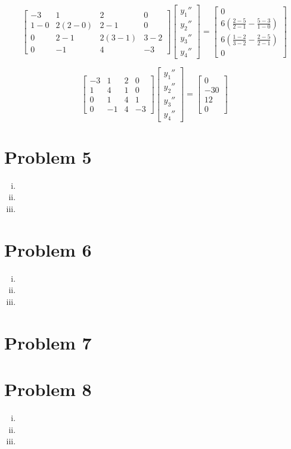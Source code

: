 \documentclass[11pt]{article} %
\begin{document}
$$\begin{bmatrix} -3 & 1 & 2 & 0 \\ 1 - 0 & 2(2 -0) &2 -1 & 0 
		 \\ 0 & 2 - 1 & 2(3 -1) & 3 - 2 \\ 0 &  -1 & 4 & -3
\end{bmatrix}
\begin{bmatrix} y_1'' \\ y_2'' \\ y_3'' \\ y_4'' \end{bmatrix} = 
\begin{bmatrix} 0 \\  6\left( \frac{2 - 5}{2 - 1} - \frac{5-3}{1 - 0} \right) \\ 
			 6\left( \frac{1 - 2}{3 - 2} - \frac{2-5}{2 - 1} \right) \\ 0\end{bmatrix}$$

$$\begin{bmatrix} -3 & 1 & 2 & 0 \\ 1 & 4 &1 & 0 
		 \\ 0 & 1 & 4 & 1 \\  0 &  -1 & 4 & -3
\end{bmatrix}
\begin{bmatrix} y_1'' \\ y_2'' \\ y_3'' \\ y_4'' \end{bmatrix} = 
\begin{bmatrix} 0 \\ -30 \\ 12 \\ 0\end{bmatrix}$$





\section*{Problem 5}
\begin{enumerate}[i.)]
\item
\item
\item
\end{enumerate}
\section*{Problem 6}
\begin{enumerate}[i.)]
\item
\item
\item
\end{enumerate}
\section*{Problem 7}

\section*{Problem 8}
\begin{enumerate}[i.)]
\item
\item
\item
\end{enumerate}
\end{document}
